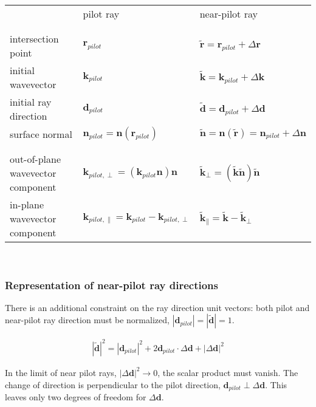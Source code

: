 \documentclass[12pt,a4paper,twoside,openright,BCOR10mm,headsepline,titlepage,abstracton,chapterprefix,final]{scrreprt}
\newcommand\Vector[1]{{\mathbf{#1}}}
\newcommand\wavenumber{k}
\newcommand\Wavevector{\Vector{\wavenumber}}
\begin{document}
\begin{tabular}{ l | l | l }
		    & pilot ray & near-pilot ray \\
& & \\ \hline & & \\
intersection point  & $\Vector{r}_{pilot}$ & $\tilde{\Vector{r}} = \Vector{r}_{pilot} + \Delta\Vector{r}$ \\
initial wavevector  & $\Wavevector_{pilot}$ & $\tilde{\Wavevector} = \Wavevector_{pilot} + \Delta\Wavevector$ \\
initial ray direction  & $\Vector{d}_{pilot}$ & $\tilde{\Vector{d}} = \Vector{d}_{pilot} + \Delta\Vector{d}$ \\
surface normal      & $\Vector{n}_{pilot} = \Vector{n}(\Vector{r}_{pilot})$ & $\tilde{\Vector{n}} = \Vector{n}(\tilde{\Vector{r}}) = \Vector{n}_{pilot} + \Delta\Vector{n}$ \\
& & \\ \hline & & \\
out-of-plane wavevector component &  $\Wavevector_{pilot, \perp} = (\Wavevector_{pilot} \Vector{n})\Vector{n}$ & $\tilde{\Wavevector}_{\perp} = (\tilde{\Wavevector} \tilde{\Vector{n}})\tilde{\Vector{n}}$ \\
in-plane wavevector component     &  $\Wavevector_{pilot, \parallel} = \Wavevector_{pilot} - \Wavevector_{pilot, \perp}$ & $\tilde{\Wavevector}_{\parallel} = \tilde{\Wavevector} - \tilde{\Wavevector}_{\perp}$ \\
\end{tabular}
\\[2ex]

\subsubsection{Representation of near-pilot ray directions}

There is an additional constraint on the ray direction unit vectors: both pilot and near-pilot ray direction must be normalized,
$|\Vector{d}_{pilot}|=|\tilde{\Vector{d}}|=1$.

\begin{eqnarray}
 |\tilde{\Vector{d}}|^2 = |\Vector{d}_{pilot}|^2 + 2 \Vector{d}_{pilot} \cdot \Delta\Vector{d} + |\Delta\Vector{d}|^2
\end{eqnarray}

In the limit of near pilot rays, $|\Delta\Vector{d}|^2 \rightarrow 0$, the scalar product must vanish. 
The change of direction is perpendicular to the pilot direction, $\Vector{d}_{pilot} \perp \Delta\Vector{d}$. 
This leaves only two degrees of freedom for $\Delta\Vector{d}$.
\end{document}
